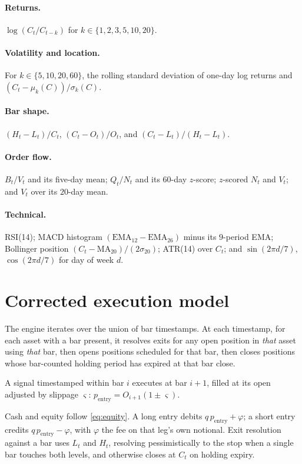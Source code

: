 \documentclass[preprint,12pt,authoryear]{elsarticle}
\begin{document}
\paragraph{Returns.} $\log(C_t / C_{t-k})$ for $k \in \{1,2,3,5,10,20\}$.

\paragraph{Volatility and location.} For $k \in \{5,10,20,60\}$, the rolling
standard deviation of one-day log returns and
$(C_t - \mu_k(C))/\sigma_k(C)$.

\paragraph{Bar shape.}
$(H_t - L_t)/C_t$, $(C_t - O_t)/O_t$, and $(C_t - L_t)/(H_t - L_t)$.

\paragraph{Order flow.} $B_t / V_t$ and its five-day mean; $Q_t / N_t$ and its
$60$-day $z$-score; $z$-scored $N_t$ and $V_t$; and $V_t$ over its $20$-day mean.

\paragraph{Technical.} RSI(14); MACD histogram
$(\mathrm{EMA}_{12} - \mathrm{EMA}_{26})$ minus its $9$-period EMA; Bollinger
position $(C_t - \mathrm{MA}_{20})/(2\sigma_{20})$; ATR(14) over $C_t$; and
$\sin(2\pi d/7)$, $\cos(2\pi d/7)$ for day of week $d$.

\section{Corrected execution model}
\label{app:execution}

The engine iterates over the union of bar timestamps. At each timestamp, for each
asset with a bar present, it resolves exits for any open position in \emph{that}
asset using \emph{that} bar, then opens positions scheduled for that bar, then
closes positions whose bar-counted holding period has expired at that bar close.

A signal timestamped within bar $i$ executes at bar $i+1$, filled at its open
adjusted by slippage $\varsigma$:
$p_{\text{entry}} = O_{i+1}(1 \pm \varsigma)$.

Cash and equity follow \eqref{eq:equity}. A long entry debits
$q\,p_{\text{entry}} + \varphi$; a short entry credits $q\,p_{\text{entry}} - \varphi$,
with $\varphi$ the fee on that leg's own notional. Exit resolution against a bar
uses $L_t$ and $H_t$, resolving pessimistically to the stop when a single bar
touches both levels, and otherwise closes at $C_t$ on holding expiry.
\end{document}
